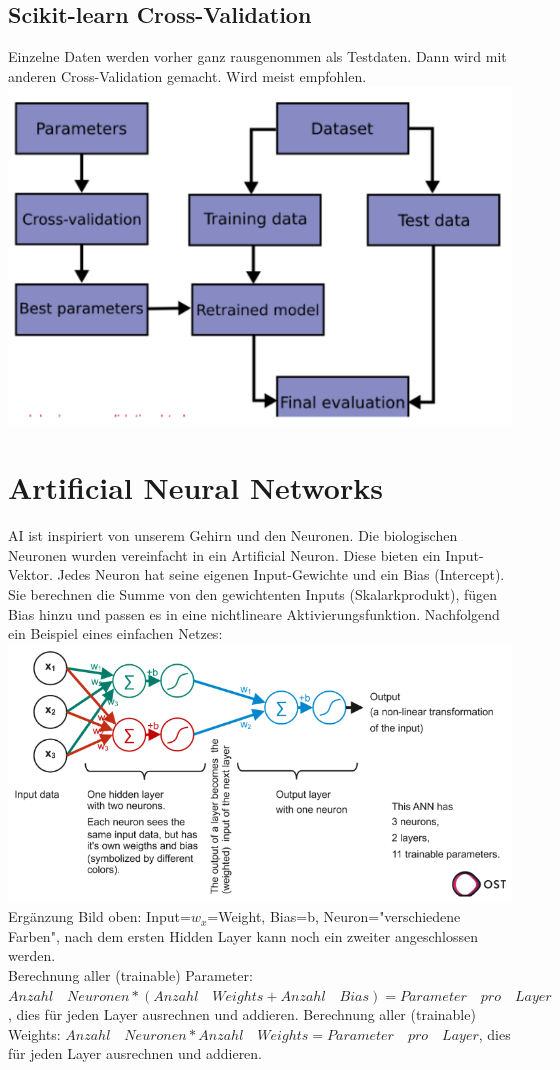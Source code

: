 \subsection{Scikit-learn Cross-Validation}
Einzelne Daten werden vorher ganz rausgenommen als Testdaten. Dann wird mit anderen Cross-Validation gemacht. Wird meist empfohlen.
\includegraphics[width=\linewidth]{img/scikit-cross-validation.png}
\section{Artificial Neural Networks}
AI ist inspiriert von unserem Gehirn und den Neuronen. Die biologischen Neuronen wurden vereinfacht in ein Artificial Neuron. Diese bieten ein Input-Vektor. Jedes Neuron hat seine eigenen Input-Gewichte und ein Bias (Intercept). Sie berechnen die Summe von den gewichtenten Inputs (Skalarkprodukt), fügen Bias hinzu und passen es in eine nichtlineare Aktivierungsfunktion. Nachfolgend ein Beispiel eines einfachen Netzes:
\includegraphics[width=\linewidth]{img/neural-network.png}
Ergänzung Bild oben: Input=$w_x$=Weight, Bias=b, Neuron="verschiedene Farben", nach dem ersten Hidden Layer kann noch ein zweiter angeschlossen werden.\\
Berechnung aller (trainable) Parameter: $Anzahl \quad Neuronen*(Anzahl \quad Weights + Anzahl  \quad Bias) = Parameter \quad pro \quad Layer$, dies für jeden Layer ausrechnen und addieren.
Berechnung aller (trainable) Weights: $Anzahl \quad Neuronen* Anzahl \quad Weights = Parameter \quad pro \quad Layer$, dies für jeden Layer ausrechnen und addieren.

